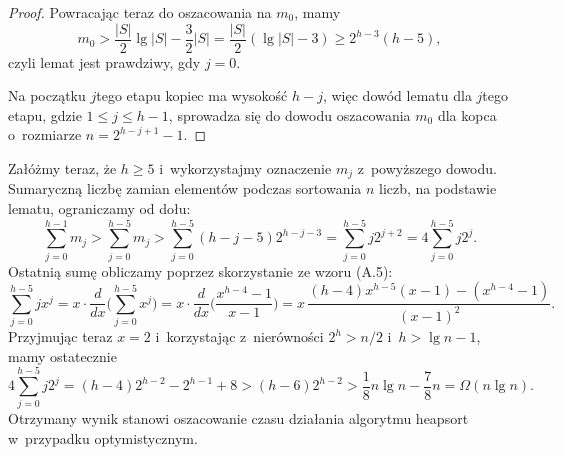 \begin{proof}
Powracając teraz do oszacowania na $m_0$, mamy
\[
    m_0 > \frac{|S|}{2}\lg|S|-\frac{3}{2}|S| = \frac{|S|}{2}(\lg|S|-3) \ge 2^{h-3}(h-5),
\]
czyli lemat jest prawdziwy, gdy $j=0$.

Na początku $j$\nbhyphen tego etapu kopiec ma wysokość $h-j$, więc dowód lematu dla $j$\nbhyphen tego etapu, gdzie $1\le j\le h-1$, sprowadza się do dowodu oszacowania $m_0$ dla kopca o~rozmiarze $n=2^{h-j+1}-1$.
\end{proof}

Załóżmy teraz, że $h\ge5$ i~wykorzystajmy oznaczenie $m_j$ z~powyższego dowodu.
Sumaryczną liczbę zamian elementów podczas sortowania $n$ liczb, na podstawie lematu, ograniczamy od dołu:
\[
    \sum_{j=0}^{h-1}m_j > \sum_{j=0}^{h-5}m_j > \sum_{j=0}^{h-5}(h-j-5)2^{h-j-3} = \sum_{j=0}^{h-5}j2^{j+2} = 4\sum_{j=0}^{h-5}j2^j.
\]
Ostatnią sumę obliczamy poprzez skorzystanie ze wzoru (A.5):
\[
    \sum_{j=0}^{h-5}jx^j = x\cdot\frac{d}{dx}\biggl(\sum_{j=0}^{h-5}x^j\biggr) = x\cdot\frac{d}{dx}\biggl(\frac{x^{h-4}-1}{x-1}\biggr) = x\,\frac{(h-4)x^{h-5}(x-1)-(x^{h-4}-1)}{(x-1)^2}.
\]
Przyjmując teraz $x=2$ i~korzystając z~nierówności $2^h>n/2$ i~$h>\lg n-1$, mamy ostatecznie
\[
    4\sum_{j=0}^{h-5}j2^j = (h-4)2^{h-2}-2^{h-1}+8 > (h-6)2^{h-2} > \frac{1}{8}n\lg n-\frac{7}{8}n = \Omega(n\lg n).
\]
Otrzymany wynik stanowi oszacowanie czasu działania algorytmu heapsort w~przypadku optymistycznym.
